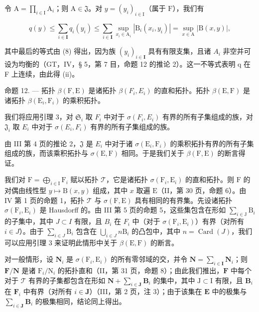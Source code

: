令 \(\mathrm{A} = \prod_{i\in \mathrm{I}}\mathrm{A}_i\)；则 \(\mathrm{A}\in \mathfrak{J}\)。对 \(y = (y_i)_{i\in \mathrm{I}}\)（属于 \(\mathrm{F}\)），我们有

\[
q (y) \leqslant \sum_ {i \in \mathbf {I}} q _ {i} (y _ {i}) \leqslant \sum_ {i \in \mathbf {I}} \sup _ {x _ {i} \in \mathrm{A} _ {i}} | \mathrm{B} _ {i} (x _ {i}, y _ {i}) | = \sup _ {x \in \mathrm{A}} | \mathrm{B} (x, y) |,
\]

其中最后的等式由 (8) 得出，因为族 \((y_{i})_{i\in\mathbf{I}}\) 具有有限支集，且诸 \(A_{i}\) 非空并可设为均衡的（GT，IV，§ 5，第 7 目，命题 12 的推论 2）。这一不等式表明 q 在 F 上连续，由此得 (ii)。

命题 12. --- 拓扑 \(\beta(\mathrm{F},\mathrm{E})\) 是诸拓扑 \(\beta(F_i,E_i)\) 的直和拓扑。拓扑 \(\beta(\mathrm{E},\mathrm{F})\) 是诸拓扑 \(\beta(\mathrm{E}_i,\mathrm{F}_i)\) 的乘积拓扑。

我们将应用引理 3，对 \(\mathfrak{S}_i\) 取 \(F_i\) 中对于 \(\sigma(F_i, E_i)\) 有界的所有子集组成的族，对 \(\mathfrak{J}_i\) 取 \(E_i\) 中对于 \(\sigma(E_i, F_i)\) 有界的所有子集组成的族。

由 III 第 4 页的推论 2，\(\mathfrak{J}\) 是 \(E_{i}\) 中对于诸 \(\sigma(\mathrm{E}_{i}, \mathrm{F}_{i})\) 的乘积拓扑有界的所有子集组成的族，而该乘积拓扑与 \(\sigma(\mathrm{E}, \mathrm{F})\) 相同。于是我们关于 \(\beta(\mathrm{F}, \mathrm{E})\) 的断言得证。

我们对 \(\mathrm{F} = \bigoplus_{i\in \mathrm{I}}\mathrm{F}_i\) 赋以拓扑 \(\mathcal{T}\)，它是诸拓扑 \(\sigma (\mathrm{F}_i,\mathrm{E}_i)\) 的直和拓扑。则 \(\mathrm{F}\) 的对偶由线性型 \(y\mapsto \mathrm{B}(x,y)\) 组成，其中 \(x\) 取遍 \(\mathrm{E}\)（II，第 30 页，命题 6）。由 IV 第 1 页的命题 1，拓扑 \(\mathcal{T}\) 与 \(\sigma (\mathrm{F},\mathrm{E})\) 具有相同的有界集。先设诸拓扑 \(\sigma (\mathrm{F}_i,\mathrm{E}_i)\) 是 Hausdorff 的。由 III 第 5 页的命题 5，这些集包含在形如 \(\sum_{i\in \mathrm{J}}\mathrm{B}_i\) 的子集中，其中 \(J\subset I\) 有限，且 \(B_{i}\) 在 \(F_{i}\) 中（对于 \(\sigma (\mathrm{F}_i,\mathrm{E}_i)\)）有界（对所有 \(i\in J\)）。由于 \(\sum_{i\in J}\mathrm{B}_{i}\) 包含在 \(\bigcup_{i\in J}n\mathrm{B}_{i}\) 的凸包中，其中 \(n = \operatorname {Card}(J)\)，我们可以应用引理 3 来证明此情形中关于 \(\beta (\mathrm{E},\mathrm{F})\) 的断言。

对一般情形，设 \(\mathbf{N}_i\) 是 \(\sigma (\mathrm{F}_i,\mathrm{E}_i)\) 的所有零邻域的交，并令 \(\mathbf{N} = \sum_{i\in \mathbf{I}}\mathbf{N}_i\)；则 \(\mathbf{F} / \mathbf{N}\) 是诸 \(\mathrm{F}_i / \mathrm{N}_i\) 的拓扑直和（II，第 31 页，命题 8）；由此我们推出，\(\mathbf{F}\) 中每个对于 \(\mathcal{T}\) 有界的子集都包含在形如 \(\mathbf{N} + \sum_{i\in \mathbf{J}}\mathbf{B}_i\) 的集中，其中 \(\mathrm{J}\subset \mathrm{I}\) 有限，且 \(\mathbf{B}_i\) 在 \(\mathbf{F}_i\) 中有界（对所有 \(i\in \mathbf{J}\)）（III，第 2 页，注 3）；由于该集在 \(\mathbf{E}\) 中的极集与 \(\sum_{i\in \mathbf{J}}\mathbf{B}_i\) 的极集相同，结论同上得出。

